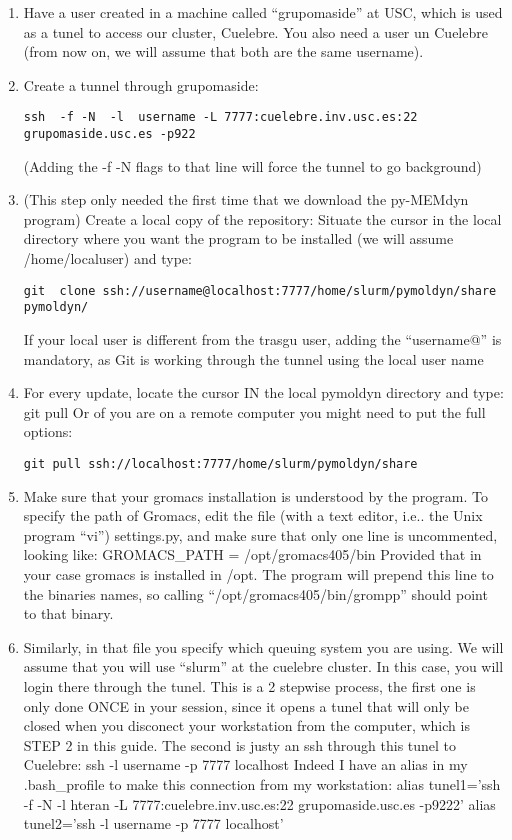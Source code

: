 \documentclass[10pt, oneside, pdftex]{article}
\begin{document}
\begin{enumerate}
\item{Have  a user  created  in  a machine  called
``grupomaside'' at USC, which is used  as a tunel to access our cluster,
Cuelebre.  You also  need a  user un  Cuelebre (from  now on,  we will
assume that both are the same username).}

\item{Create a  tunnel through  grupomaside: 
\begin{Verbatim}
ssh  -f -N  -l  username -L 7777:cuelebre.inv.usc.es:22 grupomaside.usc.es -p922 
\end{Verbatim}
(Adding  the -f -N  flags to  that line  will force  the tunnel  to go
background)}

\item{(This  step  only needed  the  first  time  that we  download  the
py-MEMdyn program) Create a local  copy of the repository: Situate the
cursor  in  the local  directory  where you  want  the  program to  be
installed  (we  will  assume  /home/localuser)  and  type:
\begin{Verbatim}
git  clone ssh://username@localhost:7777/home/slurm/pymoldyn/share  pymoldyn/  
\end{Verbatim}
If your  local  user  is  different  from the  trasgu  user,  adding  the
``username@'' is mandatory,  as Git is working through  the tunnel using
the local user name}

\item{For every update, locate the cursor IN the local pymoldyn directory
and type: git pull  Or of you are on a remote  computer you might need
to       put       the        full       options:
\begin{Verbatim}
git pull ssh://localhost:7777/home/slurm/pymoldyn/share
\end{Verbatim}
}

\item{Make sure  that your  gromacs installation  is understood  by the
program. To  specify the path of  Gromacs, edit the file  (with a text
editor, i.e.. the  Unix program ``vi'') settings.py, and  make sure that
only   one  line   is  uncommented,   looking  like:   GROMACS\_PATH  =
/opt/gromacs405/bin Provided that in your case gromacs is installed in
/opt. The  program will  prepend this line  to the binaries  names, so
calling ``/opt/gromacs405/bin/grompp'' should point to that binary.}

\item{Similarly,  in that file you  specify which queuing  system you are
using.  We will  assume  that you  will  use ``slurm''  at the  cuelebre
cluster. In this case, you will login there through the tunel. This is
a 2 stepwise process, the first one is only done ONCE in your session,
since it  opens a tunel  that will only  be closed when  you disconect
your workstation from the computer, which is STEP 2 in this guide. The
second is justy an ssh through this tunel to Cuelebre: ssh -l username
-p 7777 localhost  Indeed I have an alias in  my .bash\_profile to make
this connection from my workstation: alias tunel1='ssh -f -N -l hteran
-L   7777:cuelebre.inv.usc.es:22   grupomaside.usc.es  -p9222'   alias
tunel2='ssh -l username -p 7777 localhost'

}
\end{enumerate}
\end{document}
